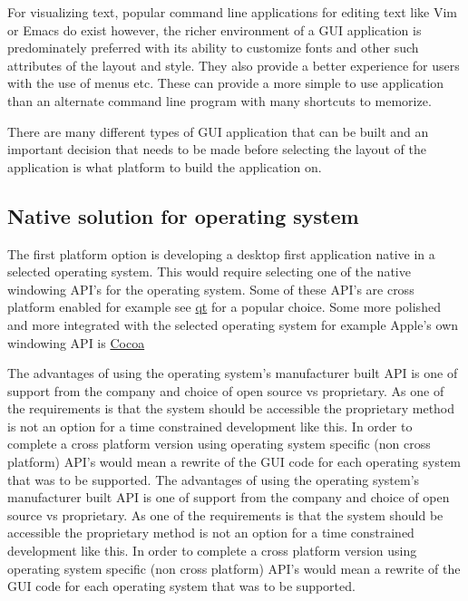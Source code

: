 For visualizing text, popular command line applications for editing text
like Vim or Emacs do exist however, the richer environment of a GUI
application is predominately preferred with its ability to customize
fonts and other such attributes of the layout and style. They also
provide a better experience for users with the use of menus etc. These
can provide a more simple to use application than an alternate command
line program with many shortcuts to memorize.

There are many different types of GUI application that can be built and
an important decision that needs to be made before selecting the layout
of the application is what platform to build the application on.

\subsection{Native solution for operating
system}\label{native-solution-for-operating-system}

The first platform option is developing a desktop first application
native in a selected operating system. This would require selecting one
of the native windowing API's for the operating system. Some of these
API's are cross platform enabled for example see
\href{http://www.qt.io/}{qt} for a popular choice. Some more polished
and more integrated with the selected operating system for example
Apple's own windowing API is
\href{https://en.wikipedia.org/wiki/Cocoa_(API)}{Cocoa}

The advantages of using the operating system's manufacturer built API is
one of support from the company and choice of open source vs
proprietary. As one of the requirements is that the system should be
accessible the proprietary method is not an option for a time
constrained development like this. In order to complete a cross platform
version using operating system specific (non cross platform) API's would
mean a rewrite of the GUI code for each operating system that was to be
supported. The advantages of using the operating system's manufacturer
built API is one of support from the company and choice of open source
vs proprietary. As one of the requirements is that the system should be
accessible the proprietary method is not an option for a time
constrained development like this. In order to complete a cross platform
version using operating system specific (non cross platform) API's would
mean a rewrite of the GUI code for each operating system that was to be
supported.

